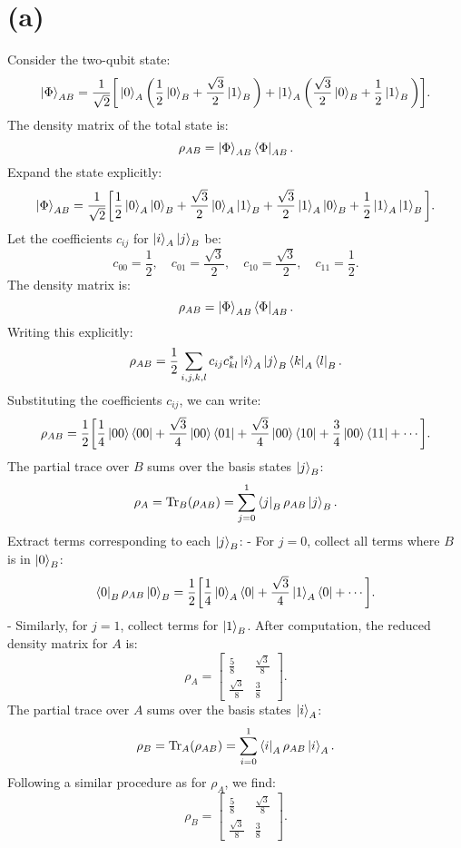 \documentclass{article}
\begin{document}
\section*{(a)}
Consider the two-qubit state:
\[
\ket{\Phi}_{AB} = \frac{1}{\sqrt{2}} \bigg[ \ket{0}_A \bigg(\frac{1}{2}\ket{0}_B + \frac{\sqrt{3}}{2}\ket{1}_B \bigg) + \ket{1}_A \bigg(\frac{\sqrt{3}}{2}\ket{0}_B + \frac{1}{2}\ket{1}_B \bigg) \bigg].
\]
The density matrix of the total state is:
\[
\rho_{AB} = \ket{\Phi}_{AB} \bra{\Phi}_{AB}.
\]
Expand the state explicitly:
\[
\ket{\Phi}_{AB} = \frac{1}{\sqrt{2}} \bigg[ \frac{1}{2}\ket{0}_A \ket{0}_B + \frac{\sqrt{3}}{2}\ket{0}_A \ket{1}_B + \frac{\sqrt{3}}{2}\ket{1}_A \ket{0}_B + \frac{1}{2}\ket{1}_A \ket{1}_B \bigg].
\]
Let the coefficients \(c_{ij}\) for \(\ket{i}_A \ket{j}_B\) be:
\[
c_{00} = \frac{1}{2}, \quad c_{01} = \frac{\sqrt{3}}{2}, \quad c_{10} = \frac{\sqrt{3}}{2}, \quad c_{11} = \frac{1}{2}.
\]
The density matrix is:
\[
\rho_{AB} = \ket{\Phi}_{AB} \bra{\Phi}_{AB}.
\]
Writing this explicitly:
\[
\rho_{AB} = \frac{1}{2} \sum_{i,j,k,l} c_{ij} c_{kl}^* \ket{i}_A\ket{j}_B \bra{k}_A \bra{l}_B.
\]
Substituting the coefficients \(c_{ij}\), we can write:
\[
\rho_{AB} = \frac{1}{2} \bigg[ \frac{1}{4} \ket{00}\bra{00} + \frac{\sqrt{3}}{4} \ket{00}\bra{01} + \frac{\sqrt{3}}{4} \ket{00}\bra{10} + \frac{3}{4} \ket{00}\bra{11} + \cdots \bigg].
\]
The partial trace over \(B\) sums over the basis states \(\ket{j}_B\):
\[
\rho_A = \text{Tr}_B(\rho_{AB}) = \sum_{j=0}^1 \bra{j}_B \rho_{AB} \ket{j}_B.
\]
Extract terms corresponding to each \(\ket{j}_B\):
- For \(j = 0\), collect all terms where \(B\) is in \(\ket{0}_B\):
\[
\bra{0}_B \rho_{AB} \ket{0}_B = \frac{1}{2} \bigg[ \frac{1}{4} \ket{0}_A\bra{0} + \frac{\sqrt{3}}{4} \ket{1}_A\bra{0} + \cdots \bigg].
\]
- Similarly, for \(j = 1\), collect terms for \(\ket{1}_B\).
After computation, the reduced density matrix for \(A\) is:
\[
\rho_A = \begin{bmatrix}
\frac{5}{8} & \frac{\sqrt{3}}{8} \\
\frac{\sqrt{3}}{8} & \frac{3}{8}
\end{bmatrix}.
\]
The partial trace over \(A\) sums over the basis states \(\ket{i}_A\):
\[
\rho_B = \text{Tr}_A(\rho_{AB}) = \sum_{i=0}^1 \bra{i}_A \rho_{AB} \ket{i}_A.
\]
Following a similar procedure as for \(\rho_A\), we find:
\[
\rho_B = \begin{bmatrix}
\frac{5}{8} & \frac{\sqrt{3}}{8} \\
\frac{\sqrt{3}}{8} & \frac{3}{8}
\end{bmatrix}.
\]
\end{document}
